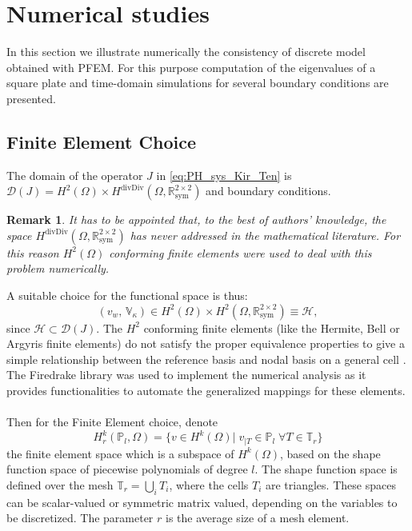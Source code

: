 \documentclass[preprint,12pt]{elsarticle}
\newtheorem{remark}{Remark}
\begin{document}
{
\section{Numerical studies}
\label{sec:Num}
In this section we illustrate numerically the consistency of discrete model obtained with PFEM. For this purpose computation of the eigenvalues of a square plate and time-domain simulations for several boundary conditions are presented. 
\subsection{Finite Element Choice}
The domain of the operator $J$ in \eqref{eq:PH_sys_Kir_Ten} is $\mathcal{D}(J) = H^{2}(\Omega) \times  H^{\text{divDiv}}(\Omega, \mathbb{R}^{2 \times 2}_{\text{sym}})$ and boundary conditions. 
\begin{remark}
	It has to be appointed that, to the best of authors' knowledge, the space $H^{\text{divDiv}}(\Omega, \mathbb{R}^{2 \times 2}_{\text{sym}})$ has never addressed in the mathematical literature. For this reason $H^{2}(\Omega)$ conforming finite elements were used to deal with this problem numerically. 
\end{remark}
A suitable choice for the functional space is thus:
\begin{equation}
(v_w, \,\mathbb{V}_\kappa) \in H^{2}(\Omega) \times H^{2}(\Omega, \mathbb{R}^{2 \times 2}_{\text{sym}}) \equiv \mathscr{H},
\end{equation}
since $\mathscr{H} \subset \mathcal{D}(J)$. 
The $H^2$ conforming finite elements (like the Hermite, Bell or Argyris finite elements) do not satisfy the proper equivalence properties to give a simple relationship between the reference basis and nodal basis on a general cell \cite{KirbyFE}. The Firedrake library \cite{firedrake} was used to implement the numerical analysis as it provides functionalities to automate the generalized mappings for these elements. \\ \\
Then for the Finite Element choice, denote
\[ H_r^k(\mathbb{P}_l, \Omega) = \{ v \in H^k(\Omega)|\; v_{|T} \in \mathbb{P}_l \; \forall T \in \mathbb{T}_r \} 
\]
the finite element space which is a subspace of $H^k(\Omega)$, based on the shape function space of piecewise polynomials of degree $l$. The shape function space is defined over the mesh $\mathbb{T}_r = \bigcup_i T_i$, where the cells $T_i$ are triangles. These spaces can be scalar-valued or symmetric matrix valued, depending on the variables to be discretized. The parameter $r$ is the average size of a mesh element.
}
\end{document}
